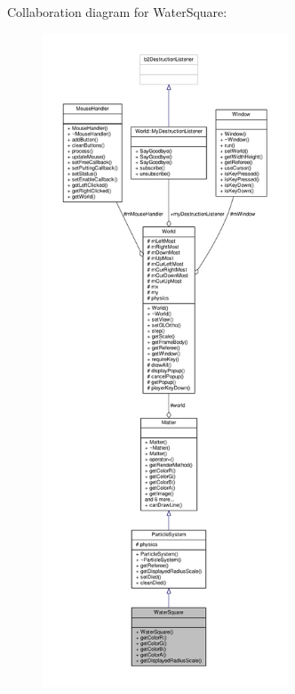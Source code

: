 Collaboration diagram for Water\+Square\+:\nopagebreak
\begin{figure}[H]
\begin{center}
\leavevmode
\includegraphics[height=550pt]{classWaterSquare__coll__graph}
\end{center}
\end{figure}
